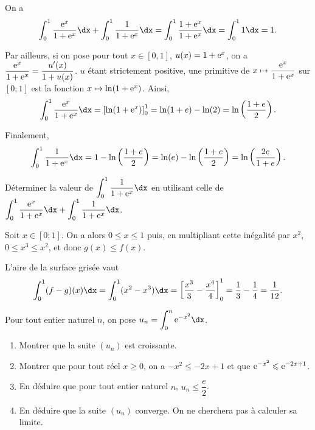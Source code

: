 \documentclass[11pt,fleqn, openany]{book} %
\begin{document}
\begin{solution}
On a \[\displaystyle \int_{0}^1 \dfrac{\e^x}{1+\e^x}\dx +  \int _0^1 \dfrac{1}{1+\e^x}\dx = \int _0^1 \dfrac{1+\e^x}{1+\e^x}\dx = \int _0^1 1\dx = 1 .\]

Par ailleurs, si on pose pour tout \(x\in [0,1]\), \(u(x)=1+\mathrm{e}^x\), on a \(\dfrac{\mathrm{e}^x}{1+\mathrm{e}^x}=\dfrac{u'(x)}{1+u(x)}\). \(u\) étant strictement positive, une primitive de \(x \mapsto \dfrac{\mathrm{e}^x}{1+\mathrm{e}^x}\) sur \([0;1]\) est la fonction \(x \mapsto \ln(1+\mathrm{e}^x)\). Ainsi, 
\[\displaystyle \int_{0}^1 \dfrac{\e^x}{1+\e^x}\dx = \left[ \ln(1+\e^x)\right]_0^1 = \ln(1+e)-\ln(2)=\ln\left(\dfrac{1+e}{2}\right) .\]

Finalement, 
\[  \int _0^1 \dfrac{1}{1+\e^x}\dx = 1 - \ln\left(\dfrac{1+e}{2}\right) = \ln(e)-\ln\left(\dfrac{1+e}{2}\right) = \ln\left(\dfrac{2e}{1+e}\right) .\]

\end{solution}



\begin{exercise}[topic=int02]Déterminer la valeur de $\displaystyle\int _0^1 \dfrac{1}{1+\e^x}\dx$ en utilisant celle de $\displaystyle \int_{0}^1 \dfrac{\e^x}{1+\e^x}\dx +  \int _0^1 \dfrac{1}{1+\e^x}\dx$.\end{exercise}

\begin{solution}
Soit \(x\in[0;1]\). On a alors \(0\leqslant x \leqslant 1\) puis, en multipliant cette inégalité par \(x^2\), \(0\leqslant x^3 \leqslant x^2\), et donc \(g(x)\leqslant f(x)\).

L'aire de la surface grisée vaut \[\int_0^1 (f-g)(x)\dx = \int_0^1 (x^2-x^3)\dx = \left[\dfrac{x^3}{3}-\dfrac{x^4}{4}\right]_0^1=\dfrac{1}{3}-\dfrac{1}{4}=\dfrac{1}{12}.\]
\newpage \end{solution}



\begin{exercise}[topic=int02]
Pour tout entier naturel  $n$, on pose $u_n=\displaystyle \int _{0}^n\e^{-x^2}\dx$.
\begin{enumerate}
\item Montrer que la suite $(u_n)$ est croissante.
\item Montrer que pour tout réel $x\geqslant 0$, on a $-x^2 \leqslant -2x+1$ et que $\mathrm{e}^{-x^2}\leqslant \mathrm{e}^{-2x+1}$.
\item En déduire que pour tout entier naturel $n$, $u_n \leqslant \dfrac{e}{2}$.
\item En déduire que la suite $(u_n)$ converge. On ne cherchera pas à calculer sa limite.
\end{enumerate}\end{exercise}
\end{document}
